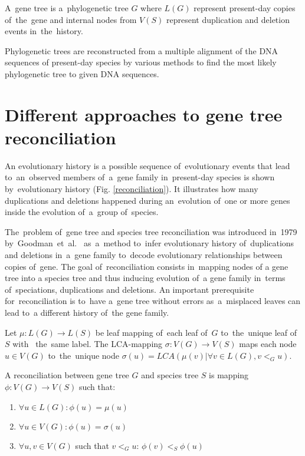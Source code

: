 A~gene tree is a~phylogenetic tree $G$ where $L(G)$ represent present-day copies of~the~gene and internal nodes from $V(S)$ represent duplication and deletion events in~the~history.

Phylogenetic trees are reconstructed from a multiple alignment of the DNA sequences of present-day species by various methods \cite{felsenstein} to find  the most likely phylogenetic tree to given DNA sequences.

\section{Different approaches to gene tree reconciliation}
An evolutionary history is a possible sequence of~evolutionary events that lead to~an~observed members of~a~gene family in~present-day species is shown by~evolutionary history (Fig. \ref{reconciliation}). It illustrates how many duplications and deletions happened during an~evolution of~one or more genes inside the evolution of~a~group of~species.

The~problem of~gene tree and species tree reconciliation was introduced in~1979 by~Goodman~et~al.~\cite{goodman} as~a~method to~infer evolutionary history of~duplications and deletions in~a~gene family to~decode evolutionary relationships between copies of~gene. The goal of~reconciliation consists in~mapping nodes of a gene tree into a species tree and thus inducing evolution of~a gene family in~terms of~speciations, duplications and deletions. An important prerequisite for~reconciliation is to~have a~gene tree without errors as~a~misplaced leaves can lead to~a different history of~the gene family.

Let $\mu: L(G) \rightarrow L(S)$ be leaf mapping of~each leaf of~$G$ to~the~unique leaf of~$S$ with~ the~same label. The LCA-mapping $\sigma: V(G) \rightarrow V(S)$ maps each node $u \in V(G)$ to~the~unique node $\sigma(u) = LCA(\mu(v) | \forall v \in L(G), v<_Gu)$.

\begin{definition}
A reconciliation between gene tree $G$ and species tree $S$ is mapping $\phi: V(G) \rightarrow V(S)$ such that:
	\begin{enumerate}\itemsep0em
	\item $\forall u \in L(G): \phi(u) = \mu(u)$
	\item $\forall u \in V(G): \phi(u) = \sigma(u)$
	\item $\forall u, v \in V(G)$ such that $v<_Gu$: $\phi(v)<_S\phi(u)$
	\end{enumerate}
\end{definition}


